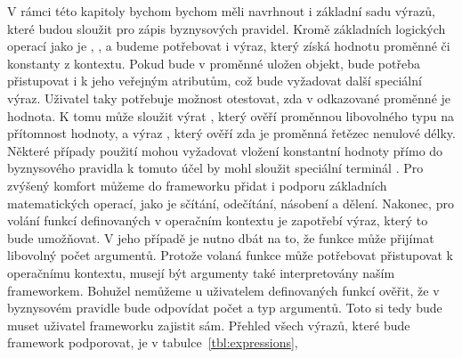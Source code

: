V rámci této kapitoly bychom bychom měli navrhnout i základní sadu výrazů, které budou
sloužit pro zápis byznysových pravidel. Kromě základních logických operací jako je
, ,  a  budeme potřebovat i výraz,
který získá hodnotu proměnné či konstanty z kontextu. Pokud bude v proměnné uložen
objekt, bude potřeba přistupovat i k jeho veřejným atributům, což bude vyžadovat další
speciální výraz. Uživatel taky potřebuje možnost otestovat, zda v odkazované proměnné
je hodnota. K tomu může sloužit výrat , který ověří proměnnou libovolného
typu na přítomnost hodnoty, a výraz , který ověří zda je proměnná řetězec
nenulové délky. Některé případy použití mohou vyžadovat vložení konstantní hodnoty přímo do byznysového
pravidla \textendash\xspace k tomuto účel by mohl sloužit speciální terminál .
Pro zvýšený komfort můžeme do frameworku přidat i podporu základních matematických operací,
jako je sčítání, odečítání, násobení a dělení. Nakonec, pro volání funkcí definovaných
v operačním kontextu je zapotřebí výraz, který to bude umožňovat. V jeho případě je nutno
dbát na to, že funkce může přijímat libovolný počet argumentů. Protože volaná funkce může potřebovat
přistupovat k operačnímu kontextu, musejí být argumenty také interpretovány naším frameworkem.
Bohužel nemůžeme u uživatelem definovaných funkcí ověřit, že v byznysovém pravidle bude odpovídat
počet a typ argumentů. Toto si tedy bude muset uživatel frameworku zajistit sám.
Přehled všech výrazů, které bude framework podporovat, je v tabulce~\ref{tbl:expressions},

